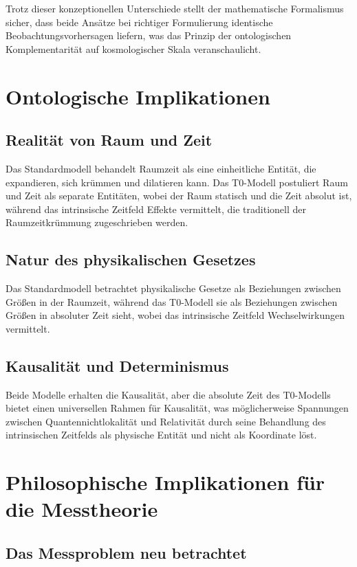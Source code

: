 \documentclass[12pt,a4paper]{article}
\begin{document}
	Trotz dieser konzeptionellen Unterschiede stellt der mathematische Formalismus sicher, dass beide Ansätze bei richtiger Formulierung identische Beobachtungsvorhersagen liefern, was das Prinzip der ontologischen Komplementarität auf kosmologischer Skala veranschaulicht.
	
	\section{Ontologische Implikationen}
	
	\subsection{Realität von Raum und Zeit}
	Das Standardmodell behandelt Raumzeit als eine einheitliche Entität, die expandieren, sich krümmen und dilatieren kann. Das T0-Modell postuliert Raum und Zeit als separate Entitäten, wobei der Raum statisch und die Zeit absolut ist, während das intrinsische Zeitfeld Effekte vermittelt, die traditionell der Raumzeitkrümmung zugeschrieben werden.
	
	\subsection{Natur des physikalischen Gesetzes}
	Das Standardmodell betrachtet physikalische Gesetze als Beziehungen zwischen Größen in der Raumzeit, während das T0-Modell sie als Beziehungen zwischen Größen in absoluter Zeit sieht, wobei das intrinsische Zeitfeld Wechselwirkungen vermittelt.
	
	\subsection{Kausalität und Determinismus}
	Beide Modelle erhalten die Kausalität, aber die absolute Zeit des T0-Modells bietet einen universellen Rahmen für Kausalität, was möglicherweise Spannungen zwischen Quantennichtlokalität und Relativität durch seine Behandlung des intrinsischen Zeitfelds als physische Entität und nicht als Koordinate löst.
	
	\section{Philosophische Implikationen für die Messtheorie}
	
	\subsection{Das Messproblem neu betrachtet}
	
\end{document}

